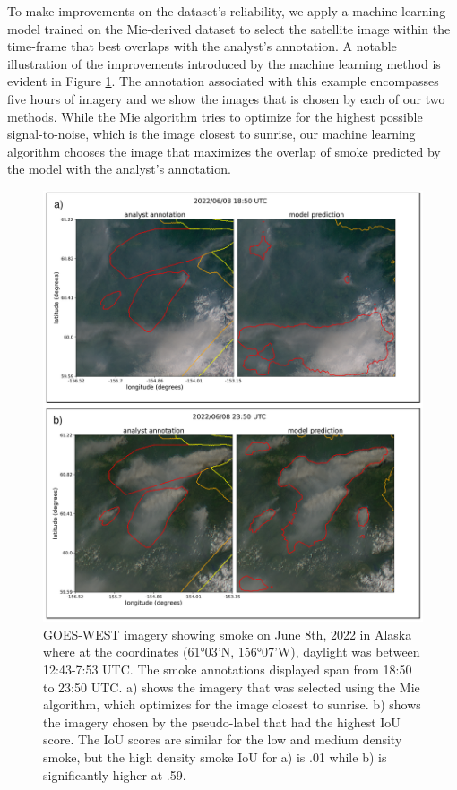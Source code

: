 \documentclass{article}
\begin{document}
To make improvements on the dataset's reliability, we apply a machine learning model trained on the Mie-derived dataset to select the satellite image within the time-frame that best overlaps with the analyst's annotation. A notable illustration of the improvements introduced by the machine learning method is evident in Figure \ref{ml_vs_mei}. The annotation associated with this example encompasses five hours of imagery and we show the images that is chosen by each of our two methods. While the Mie algorithm tries to optimize for the highest possible signal-to-noise, which is the image closest to sunrise, our machine learning algorithm chooses the image that maximizes the overlap of smoke predicted by the model with the analyst's annotation.

\begin{figure}
    \centering
    \includegraphics[width=15cm]{figures/ML_better_than_Mei_2.png}
    \caption{GOES-WEST imagery showing smoke on June 8th, 2022 in Alaska where at the coordinates (61°03'N, 156°07'W), daylight was between 12:43-7:53 UTC. The smoke annotations displayed span from 18:50 to 23:50 UTC. a) shows the imagery that was selected using the Mie algorithm, which optimizes for the image closest to sunrise. b) shows the imagery chosen by the pseudo-label that had the highest IoU score. The IoU scores are similar for the low and medium density smoke, but the high density smoke IoU for a) is .01 while b) is significantly higher at .59.}\label{ml_vs_mei}
\end{figure}
\end{document}
